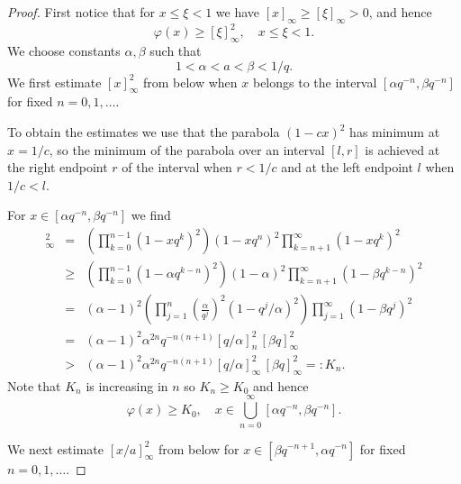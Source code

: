 \documentclass [12pt]{article}
\begin{document}
\begin{proof} First notice that for $x\le \xi<1$ we have $[x]_\infty \ge [\xi]_\infty>0$, and hence
\begin{equation}\label{eq:1}
\varphi(x)\ge [\xi]_\infty^2,\quad x\le \xi<1.
\end{equation}
 We choose constants $\alpha,\beta$ such that
\begin{equation}
1<\alpha<a<\beta<1/q.
\end{equation} 
We first estimate $[x]_\infty^2$ from below when $x$ belongs to the interval $[\alpha q^{-n},\beta q^{-n}]$ for fixed $n=0,1,\ldots.$

To obtain the estimates we use that the parabola $(1-cx)^2$ has minimum at $x=1/c$, so the minimum of the parabola over an interval $[l,r]$ is achieved at the right endpoint $r$ of the interval when $r<1/c$ and at the left endpoint $l$ when $1/c<l$.
 
For $x\in[\alpha q^{-n}, \beta q^{-n}]$ we find
\begin{eqnarray*}
[x]_\infty^2&=&\left(\prod_{k=0}^{n-1}(1-xq^k)^2\right) (1-xq^n)^2\prod_{k=n+1}^\infty (1-xq^k)
^2\\
&\ge& \left(\prod_{k=0}^{n-1}(1-\alpha q^{k-n})^2\right)(1-\alpha)^2\prod_{k=n+1}^\infty(1-\beta q^{k-n})^2\\
&=& (\alpha-1)^2\left(\prod_{j=1}^n\left(\frac{\alpha}{q^j}\right)^2(1-q^j/\alpha)^2\right)\prod_{j=1}^\infty(1-\beta q^j)^2\\
&=& (\alpha-1)^2\alpha^{2n}q^{-n(n+1)}[q/\alpha]_n^2\,[\beta q]_\infty^2\\
&>&(\alpha-1)^2\alpha^{2n}q^{-n(n+1)}[q/\alpha]_\infty^2\,[\beta q]_\infty^2=:K_n.
\end{eqnarray*}
Note that $K_n$ is increasing in $n$ so $K_n\ge K_0$ and hence
\begin{equation}\label{eq:2}
\varphi(x)\ge K_0,\quad x\in\bigcup_{n=0}^\infty [\alpha q^{-n},\beta q^{-n}].
\end{equation} 

We next estimate $[x/a]_\infty^2$ from below for $x\in [\beta q^{-n+1},\alpha q^{-n}]$
for fixed $n=0,1,\ldots.$


\end{proof}
\end{document}
